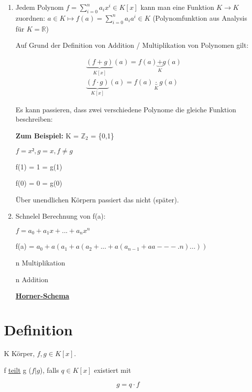 \documentclass[a4paper, openany]{book}
\begin{document}
    \begin{enumerate}[label=(\alph*)] 
      \item Jedem Polynom $f =  \sum_{i=0}^{n} a_ix^i \in K[x]$ kann man eine Funktion $K \rightarrow K$ zuordnen: $a \in K \mapsto f(a) = \sum_{i=0}^{n} a_ia^i \in K$ (Polynomfunktion aus Analysis für $K = \mathbb{R}$)

      Auf Grund der Definition von Addition / Multiplikation von Polynomen gilt:

      \begin{equation}
        \begin{split}
          \underbrace{(f+g)}_{K[x]} (a) = f(a) \underbrace{+}_{K} g(a) \\
          \underbrace{(f \cdot g)}_{K[x]} (a) = f(a) \underbrace{\cdot}_{K} g(a)
        \end{split}
      \end{equation}

      Es kann passieren, dass zwei verschiedene Polynome die gleiche Funktion beschreiben:

      \textbf{Zum Beispiel:} K = $\mathbb{Z}_2$ = \{0,1\}

      $f = x², g = x, f \neq g$

      f(1) = 1 = g(1)

      f(0) = 0 = g(0)

      Über unendlichen Körpern passiert das nicht (später).

      \item Schnelel Berechnung von f(a):

      $f = a_0+a_1x+...+a_nx^n$

      f(a) = $a_0 + a(a_1+a(a_2+...+a(a_{n-1}+aa---.n) ...))$

      n Multiplikation

      n Addition

      \textbf{\underline{Horner-Schema}}
    \end{enumerate}

    \section{Definition} 

    K Körper, $f,g \in K[x]$.

    f \underline{teilt} g ($f|g$), falls $q \in K[x]$ existiert mit

    \begin{equation}
      g = q \cdot f
    \end{equation}
\end{document}
